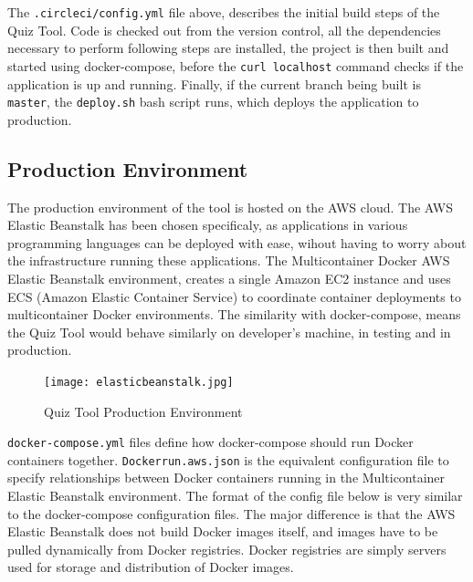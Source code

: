 The \texttt{.circleci/config.yml} file above, describes the initial build steps of the Quiz Tool.
Code is checked out from the version control, all the dependencies necessary to perform following
steps are installed, the project is then built and started using docker-compose, before the
\texttt{curl localhost} command checks if the application is up and running. Finally, if
the current branch being built is \texttt{master}, the \texttt{deploy.sh} bash script runs, which
deploys the application to production.

\subsection{Production Environment}
The production environment of the tool is hosted on the AWS cloud. The AWS Elastic Beanstalk
has been chosen specificaly, as applications in
various programming languages can be deployed with ease, wihout having to worry about
the infrastructure running these applications\cite{37}. The Multicontainer Docker AWS Elastic
Beanstalk\cite{38} environment, creates a single Amazon EC2\cite{39}
instance and uses ECS (Amazon Elastic Container Service)\cite{40} to coordinate container deployments to
multicontainer Docker environments. The similarity with docker-compose, means the Quiz Tool
would behave similarly on developer's machine, in testing and in production.

\begin{figure}[h!]
    \centering
    \texttt{[image: elasticbeanstalk.jpg]}
    \caption{Quiz Tool Production Environment}
    \label{fig:ebs}
\end{figure}

\texttt{docker-compose.yml} files define how docker-compose should run Docker containers together.
\texttt{Dockerrun.aws.json} is the equivalent configuration file to specify relationships between Docker
containers running in the Multicontainer Elastic Beanstalk environment. The format of the config file below is very
similar to the docker-compose configuration files. The major
difference is that the AWS Elastic Beanstalk does not build Docker images itself, and images have
to be pulled dynamically from Docker registries. Docker registries are simply servers used for storage and
distribution of Docker images.

